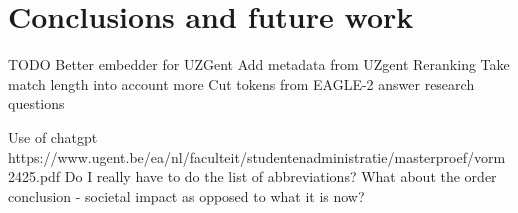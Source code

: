
\chapter{Conclusions and future work}
\label{sec:conclusion_future_work}
TODO
Better embedder for UZGent
Add metadata from UZgent
Reranking
Take match length into account more
Cut tokens from EAGLE-2
answer research questions

Use of chatgpt
https://www.ugent.be/ea/nl/faculteit/studentenadministratie/masterproef/vorm2425.pdf
    Do I really have to do the list of abbreviations?
    What about the order conclusion - societal impact as opposed to what it is now?